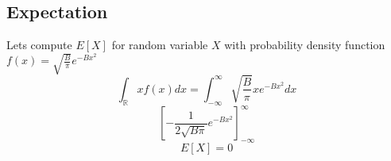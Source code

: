 \documentclass{article}
\begin{document}
\subsection{Expectation}

Lets compute $E[X]$ for random variable $X$ with probability density function $f(x) = \sqrt{\frac{B}{\pi}} e^{-Bx^2}$
\[\int_{\mathbb{R}} x f(x) dx = \int_{-\infty}^\infty \sqrt{\frac{B}{\pi}} x e^{-Bx^2}dx\]
\[\left[-\frac{1}{2\sqrt{B\pi}}e^{-Bx^2}\right]_{-\infty}^{\infty}\]
\[E[X] = 0\]
\end{document}
